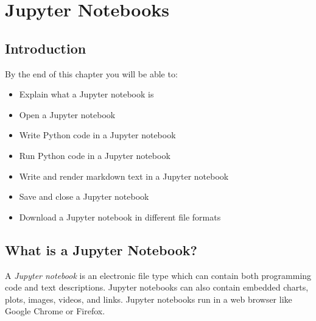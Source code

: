 \documentclass{book}
\begin{document}
    




    
        \hypertarget{jupyter-notebooks}{%
\chapter{Jupyter Notebooks}\label{jupyter-notebooks}}
    




    
        \hypertarget{introduction}{%
\section{Introduction}\label{introduction}}
    




    
        By the end of this chapter you will be able to:

\begin{itemize}
\item
  Explain what a Jupyter notebook is
\item
  Open a Jupyter notebook
\item
  Write Python code in a Jupyter notebook
\item
  Run Python code in a Jupyter notebook
\item
  Write and render markdown text in a Jupyter notebook
\item
  Save and close a Jupyter notebook
\item
  Download a Jupyter notebook in different file formats
\end{itemize}
        \newpage

    




    
        \hypertarget{what-is-a-jupyter-notebook}{%
\section{What is a Jupyter Notebook?}\label{what-is-a-jupyter-notebook}}
    




    
        A \emph{Jupyter notebook} is an electronic file type which can contain
both programming code and text descriptions. Jupyter notebooks can also
contain embedded charts, plots, images, videos, and links. Jupyter
notebooks run in a web browser like Google Chrome or Firefox.
    
\end{document}
